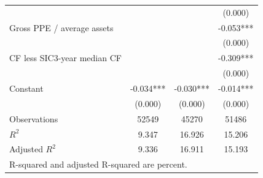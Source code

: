 {\begin{tabular}{l*{3}{c}}
                    &               &               &     (0.000)   \\
Gross PPE / average assets&               &               &      -0.053***\\
                    &               &               &     (0.000)   \\
CF less SIC3-year median CF&               &               &      -0.309***\\
                    &               &               &     (0.000)   \\
Constant            &      -0.034***&      -0.030***&      -0.014***\\
                    &     (0.000)   &     (0.000)   &     (0.000)   \\
\hline
Observations        &       52549   &       45270   &       51486   \\
\(R^{2}\)           &       9.347   &      16.926   &      15.206   \\
Adjusted \(R^{2}\)  &       9.336   &      16.911   &      15.193   \\
\hline\hline
\multicolumn{4}{l}{\footnotesize R-squared and adjusted R-squared are percent.}\\
\end{tabular}
}
